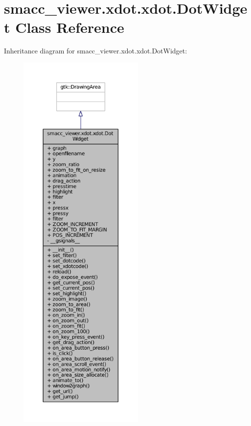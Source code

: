 \hypertarget{classsmacc__viewer_1_1xdot_1_1xdot_1_1DotWidget}{}\section{smacc\+\_\+viewer.\+xdot.\+xdot.\+Dot\+Widget Class Reference}
\label{classsmacc__viewer_1_1xdot_1_1xdot_1_1DotWidget}


Inheritance diagram for smacc\+\_\+viewer.\+xdot.\+xdot.\+Dot\+Widget\+:
\nopagebreak
\begin{figure}[H]
\begin{center}
\leavevmode
\includegraphics[height=550pt]{classsmacc__viewer_1_1xdot_1_1xdot_1_1DotWidget__inherit__graph}
\end{center}
\end{figure}



